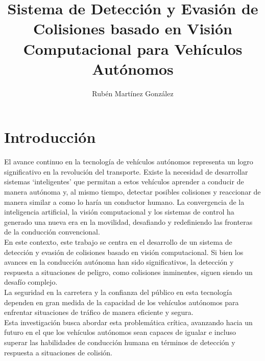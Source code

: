 \documentclass[10pt,letterpaper,final]{article}
\begin{document}
    \section*{}
    \title{Sistema de Detección y Evasión de Colisiones basado en Visión Computacional para Vehículos Autónomos}
    \author{Rubén Martínez González}
    \maketitle
    \clearpage
    \section*{Introducción}
    \noindent
    El avance continuo en la tecnología de vehículos autónomos representa un logro significativo en la revolución del transporte.
    Existe la necesidad de desarrollar sistemas ‘inteligentes' que permitan a estos vehículos aprender a conducir de manera autónoma y,
    al mismo tiempo, detectar posibles colisiones y reaccionar de manera similar a como lo haría un conductor humano.
    La convergencia de la inteligencia artificial, la visión computacional y los sistemas de control ha generado una nueva era en la movilidad,
    desafiando y redefiniendo las fronteras de la conducción convencional.\\ \newline
    En este contexto, este trabajo se centra en el desarrollo de un sistema de detección y evasión de colisiones basado en visión computacional.
    Si bien los avances en la conducción autónoma han sido significativos, la detección y respuesta a
    situaciones de peligro, como colisiones inminentes, siguen siendo un desafío complejo.\\ \newline
    La seguridad en la carretera y la confianza del público en esta tecnología dependen en gran medida de la capacidad
    de los vehículos autónomos para enfrentar situaciones de tráfico de manera eficiente y segura.\\ \newline
    Esta investigación busca abordar esta problemática crítica, avanzando hacia un futuro en el que los vehículos autónomos
    sean capaces de igualar e incluso superar las habilidades de conducción humana en términos de detección y respuesta
    a situaciones de colisión.
    \clearpage
    
\end{document}
